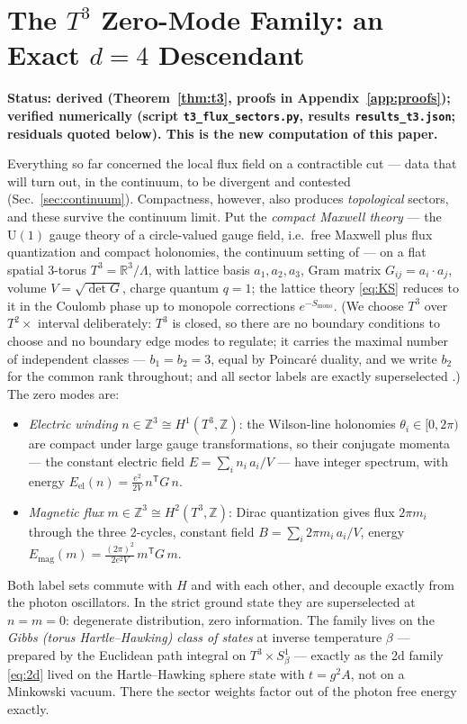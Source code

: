 \documentclass[11pt]{article}
\theoremstyle{remark}
\theoremstyle{plain}
\newcommand{\Z}{\mathbb{Z}}
\begin{document}
\section{The \texorpdfstring{$T^3$}{T3} Zero-Mode Family: an Exact \texorpdfstring{$d=4$}{d=4} Descendant}\label{sec:t3}

\textbf{Status: derived (Theorem~\ref{thm:t3}, proofs in Appendix~\ref{app:proofs}); verified numerically (script \texttt{t3\_flux\_sectors.py}, results \texttt{results\_t3.json}; residuals quoted below). This is the new computation of this paper.}

Everything so far concerned the local flux field on a contractible cut --- data that will turn out, in the continuum, to be divergent and contested (Sec.~\ref{sec:continuum}). Compactness, however, also produces \emph{topological} sectors, and these survive the continuum limit. Put the \emph{compact Maxwell theory} --- the $\mathrm{U}(1)$ gauge theory of a circle-valued gauge field, i.e.\ free Maxwell plus flux quantization and compact holonomies, the continuum setting of \cite{DW16} --- on a flat spatial 3-torus $T^3 = \mathbb{R}^3/\Lambda$, with lattice basis $a_1, a_2, a_3$, Gram matrix $G_{ij} = a_i \cdot a_j$, volume $V = \sqrt{\det G}$, charge quantum $q = 1$; the lattice theory \eqref{eq:KS} reduces to it in the Coulomb phase up to monopole corrections $e^{-S_{\mathrm{mono}}}$. (We choose $T^3$ over $T^2 \times$ interval deliberately: $T^3$ is closed, so there are no boundary conditions to choose and no boundary edge modes to regulate; it carries the maximal number of independent classes --- $b_1 = b_2 = 3$, equal by Poincar\'e duality, and we write $b_2$ for the common rank throughout; and all sector labels are exactly superselected \cite{tHooft79}.) The zero modes are:
\begin{itemize}
\item \emph{Electric winding} $n \in \Z^3 \cong H^1(T^3, \Z)$: the Wilson-line holonomies $\theta_i \in [0, 2\pi)$ are compact under large gauge transformations, so their conjugate momenta --- the constant electric field $E = \sum_i n_i\, a_i / V$ --- have integer spectrum, with energy $E_{\mathrm{el}}(n) = \frac{e^2}{2V}\, n^{\mathsf T} G\, n$.
\item \emph{Magnetic flux} $m \in \Z^3 \cong H^2(T^3, \Z)$: Dirac quantization gives flux $2\pi m_i$ through the three 2-cycles, constant field $B = \sum_i 2\pi m_i\, a_i / V$, energy $E_{\mathrm{mag}}(m) = \frac{(2\pi)^2}{2 e^2 V}\, m^{\mathsf T} G\, m$.
\end{itemize}
Both label sets commute with $H$ and with each other, and decouple exactly from the photon oscillators. In the strict ground state they are superselected at $n = m = 0$: degenerate distribution, zero information. The family lives on the \emph{Gibbs (torus Hartle--Hawking) class of states} at inverse temperature $\beta$ --- prepared by the Euclidean path integral on $T^3 \times S^1_\beta$ --- exactly as the 2d family \eqref{eq:2d} lived on the Hartle--Hawking sphere state with $t = g^2 A$, not on a Minkowski vacuum. There the sector weights factor out of the photon free energy exactly.
\end{document}
